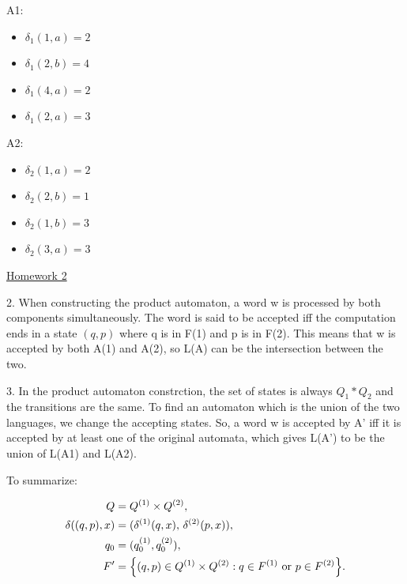 \documentclass{article}
\theoremstyle{theorem}
\theoremstyle{definition}
\theoremstyle{remark}
\begin{document}
A1:
\begin{itemize}
  \item $\delta_1(1, a) = 2$
  \item $\delta_1(2, b) = 4$
  \item $\delta_1(4, a) = 2$
  \item $\delta_1(2, a) = 3$
\end{itemize}

A2:
\begin{itemize}
  \item $\delta_2(1, a) = 2$
  \item $\delta_2(2, b) = 1$
  \item $\delta_2(1, b) = 3$
  \item $\delta_2(3, a) = 3$
\end{itemize}

\underline{Homework 2}


2. When constructing the product automaton, a word w is processed by both components simultaneously. The word is said to be accepted iff the computation ends in a state $(q,p)$ where q is in F(1) and p is in F(2). This means that w is accepted by both A(1) and A(2), so L(A) can be the intersection between the two. 

3. In the product automaton constrction, the set of states is always $Q_1 * Q_2$ and the transitions are the same. To find an automaton which is the union of the two languages, we change the accepting states. So, a word w is accepted by A' iff it is accepted by at least one of the original automata, which gives L(A') to be the union of L(A1) and L(A2). 

To summarize:

\[
\begin{aligned}
Q &= Q^{(1)}\times Q^{(2)}, \\
\delta((q,p),x) &= (\delta^{(1)}(q,x),\,\delta^{(2)}(p,x)), \\
q_0 &= (q_0^{(1)},q_0^{(2)}), \\
F' &= \Bigl\{(q,p) \in Q^{(1)}\times Q^{(2)} : q\in F^{(1)} \text{ or } p\in F^{(2)}\Bigr\}.
\end{aligned}
\]
\end{document}
